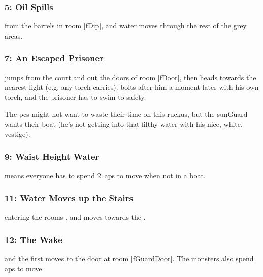 \subsubsection[Oil Spills]{5: Oil Spills}
from the barrels in room \ref{fDip}, and water moves through the rest of the grey areas.

\subsubsection[An Escaped Prisoner]{7: An Escaped Prisoner}
jumps from the \gls{court} and out the doors of room \vref{fDoor}, then heads towards the nearest light (e.g. any \gls{torch}  carries).
 bolts after him a moment later with his own \gls{torch}, and the prisoner has to swim to safety.

The \glspl{pc} might not want to waste their time on this ruckus, but the \gls{sunGuard} wants their boat (he's not getting into that filthy water with his nice, white, vestige).



\subsubsection[Waist Height Water]{9: Waist Height Water}
means everyone has to spend 2~\glspl{ap} to move when not in a boat.

\subsubsection[Water Moves up the Stairs]{11: Water Moves up the Stairs}
entering the rooms , and moves towards the  .

\subsubsection[The \Glsfmtplural{monster} Wake]{12: The  Wake}
and the first moves to the door at room \vref{fGuardDoor}.
The \glspl{monster} also spend \glspl{ap} to move.

